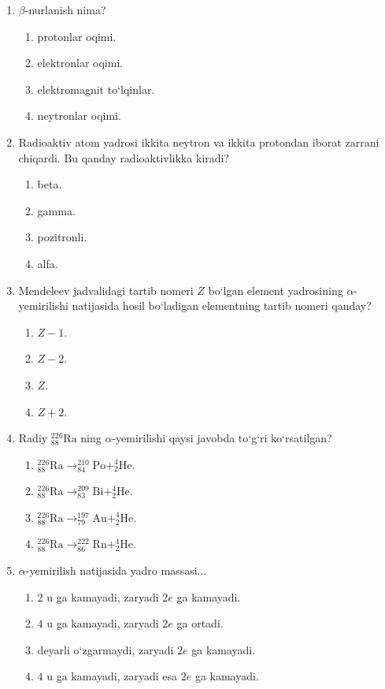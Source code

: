 \begin{enumerate}
\item $\beta$-nurlanish nima?
\begin{enumerate}[label=\Alph*)]
\item protonlar oqimi.
\item elektronlar oqimi.
\item elektromagnit to‘lqinlar.
\item neytronlar oqimi.
\end{enumerate}

\item Radioaktiv atom yadrosi ikkita neytron va ikkita protondan iborat zarrani chiqardi. Bu qanday radioaktivlikka kiradi?
\begin{enumerate}[label=\Alph*)]
\item beta.
\item gamma.
\item pozitronli.
\item alfa.
\end{enumerate}

\item Mendeleev jadvalidagi tartib nomeri $Z$ bo‘lgan element yadrosining $\alpha$-yemirilishi natijasida hosil bo‘ladigan elementning tartib nomeri qanday?
\begin{enumerate}[label=\Alph*)]
\item $Z-1$.
\item $Z-2$.
\item $Z$.
\item $Z+2$.
\end{enumerate}

\item Radiy $^{226}_{88}\text{Ra}$ ning $\alpha$-yemirilishi qaysi javobda to‘g‘ri ko‘rsatilgan?
\begin{enumerate}[label=\Alph*)]
\item $^{226}_{88}\text{Ra} \rightarrow ^{210}_{84}\text{Po} + ^4_2\text{He}$.
\item $^{226}_{88}\text{Ra} \rightarrow ^{209}_{83}\text{Bi} + ^4_2\text{He}$.
\item $^{226}_{88}\text{Ra} \rightarrow ^{197}_{79}\text{Au} + ^4_2\text{He}$.
\item $^{226}_{88}\text{Ra} \rightarrow ^{222}_{86}\text{Rn} + ^4_2\text{He}$.
\end{enumerate}

\item $\alpha$-yemirilish natijasida yadro massasi...
\begin{enumerate}[label=\Alph*)]
\item $2\text{ u}$ ga kamayadi, zaryadi $2e$ ga kamayadi.
\item $4\text{ u}$ ga kamayadi, zaryadi $2e$ ga ortadi.
\item deyarli o‘zgarmaydi, zaryadi $2e$ ga kamayadi.
\item $4\text{ u}$ ga kamayadi, zaryadi esa $2e$ ga kamayadi.
\end{enumerate}


\end{enumerate}
